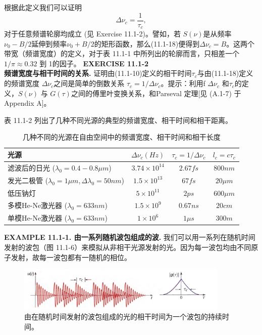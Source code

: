 \documentclass[UTF8]{ctexart}
\newcommand\crule[3][black]{\textcolor{#1}{\rule{#2}{#3}}}
\numberwithin{figure}{subsection}
\numberwithin{table}{subsection}
\begin{document}
\par 根据此定义我们可以证明
\begin{equation}
\Delta \nu_c = \frac{1}{\tau_c},
\end{equation}
对于任意频谱轮廓均成立 (见 Exercise 11.1-2)。譬如，若 $ S(\nu) $是从频率 $ \nu_0 - B/2 $延伸到频率$ \nu_0 + B/2 $的矩形函数，那么(11.1-18)便得到$ \Delta \nu_c = B $。这两个带宽（频谱宽度）的定义，对于表 11.1-1 中所列出的轮廓而言，只相差一个$1/\pi \approx 0.32 $ 到 1的因子。
\bigbreak\noindent{\crule[ksc]{\textwidth}{0.2cm}}
\textbf{EXERCISE 11.1-2} \\
\textbf{频谱宽度与相干时间的关系.} 证明由(11.1-10)定义的相干时间$ \tau_c $与由(11.1-18)定义的频谱宽度 $ \Delta \nu_c $之间是简单的倒数关系 $ \tau_c = 1/ \Delta \nu_c $。提示：利用f $ \Delta \nu_c $ 和$ \tau_c $的定义，$ S(\nu) $ 与 $ G(\tau) $之间的傅里叶变换关系，和Parseval 定理[见 (A.1-7) 于 Appendix A]。\\
\noindent{\crule[ksc]{\textwidth}{0.2cm}}
\par 表 11.1-2 列出了几种不同光源的典型的频谱宽度、相干时间和相干距离。
\begin{table}[H]
\caption{几种不同的光源在自由空间中的频谱宽度、相干时间和相干长度}
\begin{center}
\begin{tabular}{lccc}
\hline
光源 & $ \Delta \nu_c (Hz) $ & $ \tau_c = 1/\Delta \nu_c $ & $ l_c = c\tau_c $ \\
\hline
滤波后的日光 ($ \lambda_0 = 0.4-0.8 \mu m $) & $ 3.74\times 10^14 $ & $ 2.67 fs $ & $ 800 nm $ \\
发光二极管 ($ \lambda_0 = 1\mu m, \Delta \lambda_0 = 50 nm $) & $ 1.5\times 10^13 $ & $ 67 fs$ & $ 20 \mu m $ \\
低压钠灯 & $ 5\times 10^11 $ & $ 2 ps $ & $ 600 \mu m $ \\
多模He-Ne激光器 ($ \lambda_0 = 633 nm $) & $ 1.5 \times 10^9 $ & $ 0.67 ns $ & $ 20 cm $ \\
单模He-Ne激光器 ($ \lambda_0 = 633 nm $) & $ 1\times 10^6 $ & $ 1 \mu s $ & $ 300 m $ \\
\hline
\end{tabular}
\end{center}
\end{table}
\noindent{\crule[ksc]{\textwidth}{0.1cm}}
\textbf{EXAMPLE 11.1-1. 由一系列随机波包组成的波.} 我们可以用一系列在随机时间发射的波包（图 11.1-6）来模拟从非相干光源发射的光。因为每一波包均由不同原子发射，故每一波包都有一随机的相位。
\begin{figure}[H]
\centering
\includegraphics[width=0.9\textwidth]{11_1_6.PNG}
\caption{由在随机时间发射的波包组成的光的相干时间为一个波包的持续时间。}
\label{fig: 11_1_6}
\end{figure}
\end{document}
